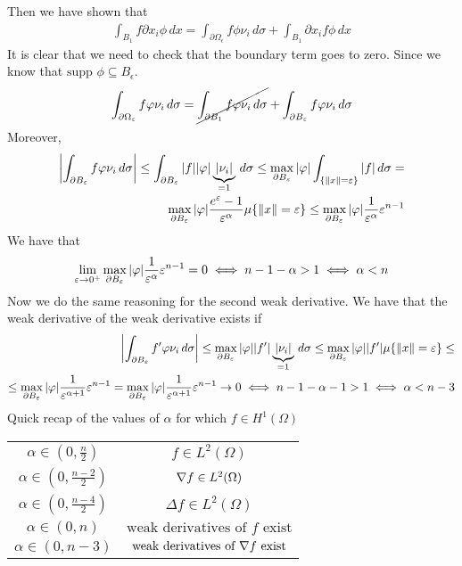 Then we have shown that 
\[
    \begin{split}
        \int_{B_1} f \partial x_i \phi \, dx = \int_{\partial\Omega_\epsilon} f \phi \nu_i \, d\sigma + \int_{B_1} \partial x_i f \phi \, dx
    \end{split}
\]
It is clear that we need to check that the boundary term goes to zero. Since we know that \(\text{supp } \phi \subseteq B_\epsilon\).
\[
    \begin{split}
        \int_{\partial\Omega_\epsilon} f \phi \nu_i \, d\sigma = \cancel{\int_{\partial B_1} f \phi \nu_i \, d\sigma} + \int_{\partial B_\epsilon} f \phi \nu_i \, d\sigma
    \end{split}
\]
Moreover,
\[
    \begin{split}
        \abs{\int_{\partial B_\epsilon} f \phi \nu_i \, d\sigma} \leq \int_{\partial B_\epsilon} \abs{f} \abs{\phi} \underbrace{\abs{\nu_i}}_{=1} \, d\sigma \leq \max_{\partial B_\epsilon} \abs{\phi} \int_{\{ \norm{x} = \epsilon \}} \abs{f} \, d\sigma = \\
        \max_{\partial B_\epsilon} \abs{\phi} \frac{e^{\epsilon} - 1}{\epsilon^\alpha} \mu\{\norm{x} = \epsilon\} \leq \max_{\partial B_\epsilon} \abs{\phi} \frac{1}{\epsilon^\alpha} \epsilon^{n-1} 
    \end{split}
\]
We have that 
\[
    \begin{split}
        \lim_{\epsilon \to 0^+} \max_{\partial B_\epsilon} \abs{\phi} \frac{1}{\epsilon^\alpha} \epsilon^{n-1} = 0 \iff n - 1 -\alpha >  1 \iff \alpha < n 
    \end{split}
\]
Now we do the same reasoning for the second weak derivative. We have that the weak derivative of the weak derivative exists if
\[
    \begin{split}
        \abs{\int_{\partial B_\epsilon} f' \phi \nu_i \, d\sigma} \leq \max_{\partial B_\epsilon}  \abs{\phi} \abs{f'} \underbrace{\abs{\nu_i}}_{=1} \, d\sigma \leq \max_{\partial B_\epsilon} \abs{\phi}  \abs{f'} \mu\{\norm{x} = \epsilon\} \leq \\
        \leq \max_{\partial B_\epsilon} \abs{\phi} \frac{1}{\epsilon^{\alpha + 1}} \epsilon^{n-1} = \max_{\partial B_\epsilon} \abs{\phi} \frac{1}{\epsilon^{\alpha + 1}} \epsilon^{n-1} \to 0 \iff n - 1 - \alpha - 1 > 1 \iff \alpha < n - 3
    \end{split}
\]
Quick recap of the values of \(\alpha\) for which \(f \in H^1(\Omega)\) %
\begin{table}[h]
    \centering
        \begin{tabular}{c|c}
            \(\alpha \in (0, \frac{n}{2})\) & \(f \in L^2(\Omega)\) \\
            \(\alpha \in (0, \frac{n - 2}{2})\) & \(\grad f \in L^2(\Omega)\) \\
            \(\alpha \in (0, \frac{n - 4}{2})\) & \(\Delta f \in L^2(\Omega)\) \\
            \(\alpha \in (0, n)\) & \(\text{weak derivatives of } f \text{ exist}\)\\
            \(\alpha \in (0, n - 3)\) & \(\text{weak derivatives of } \grad f \text{ exist}\)
        \end{tabular}
\end{table}

